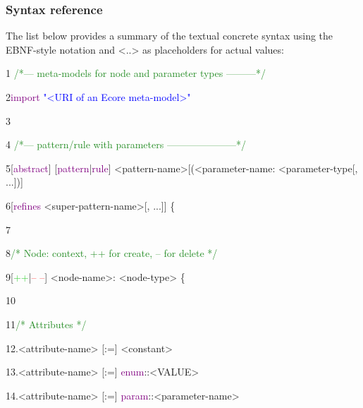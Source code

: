 \clearpage

\subsubsection{Syntax reference}

The list below provides a summary of the textual concrete syntax using the EBNF-style notation and \textsf{<..>} as placeholders for actual values:\newline\newline

{

1\hspace{0.5cm} \textcolor{ForestGreen}{/*--- meta-models for node and parameter types ---------*/}

2\hspace{0.5cm}\textcolor{Purple}{import}\textcolor{blue}{ "<URI of an Ecore meta-model>"}

3

4 \hspace{0.5cm}\textcolor{ForestGreen}{/*--- pattern/rule with parameters ---------------------*/}

5\hspace{0.5cm}[\textcolor{Purple}{abstract}] [\textcolor{Purple}{pattern}|\textcolor{Purple}{rule}] <pattern-name>[(<parameter-name: <parameter-type[, ...])]

6\hspace{0.5cm}[\textcolor{Purple}{refines} <super-pattern-name>[, ...]] \{

7

8\hspace{1cm}\textcolor{ForestGreen}{/* Node: context, ++ for create, -- for delete */}

9\hspace{1cm}[\textcolor{LimeGreen}{++}|\textcolor{Red}{-- --}] <node-name>: <node-type> \{

10

11\hspace{1.5cm}\textcolor{ForestGreen}{/* Attributes */}

12\hspace{1.5cm}.<attribute-name> [:=] <constant>

13\hspace{1.5cm}.<attribute-name> [:=] \textcolor{Purple}{enum}::<VALUE>

14\hspace{1.5cm}.<attribute-name> [:=] \textcolor{Purple}{param}::<parameter-name>

}
